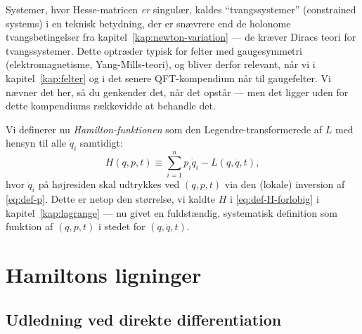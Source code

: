 \begin{bemaerkning}
Systemer, hvor Hesse-matricen \emph{er} singulær, kaldes
``tvangssystemer'' (constrained systems) i en teknisk betydning, der er
snævrere end de holonome tvangsbetingelser fra
kapitel~\ref{kap:newton-variation} — de kræver Diracs teori for
tvangssystemer. Dette optræder typisk for felter med gaugesymmetri
(elektromagnetisme, Yang-Mills-teori), og bliver derfor relevant, når
vi i kapitel~\ref{kap:felter} og i det senere QFT-kompendium når til
gaugefelter. Vi nævner det her, så du genkender det, når det opstår —
men det ligger uden for dette kompendiums rækkevidde at behandle det.
\end{bemaerkning}

Vi definerer nu \emph{Hamilton-funktionen} som den
Legendre-transformerede af $L$ med hensyn til alle $\dot q_i$
samtidigt:
\begin{equation}
  \boxed{H(q,p,t) \equiv \sum_{i=1}^n p_i\dot q_i - L(q,\dot q,t),}
  \label{eq:def-H}
\end{equation}
hvor $\dot q_i$ på højresiden skal udtrykkes ved $(q,p,t)$ via den
(lokale) inversion af \eqref{eq:def-p}. Dette er netop den størrelse,
vi kaldte $H$ i \eqref{eq:def-H-forlobig} i kapitel~\ref{kap:lagrange}
— nu givet en fuldstændig, systematisk definition som funktion af
$(q,p,t)$ i stedet for $(q,\dot q,t)$.

\section{Hamiltons ligninger}

\subsection{Udledning ved direkte differentiation}

